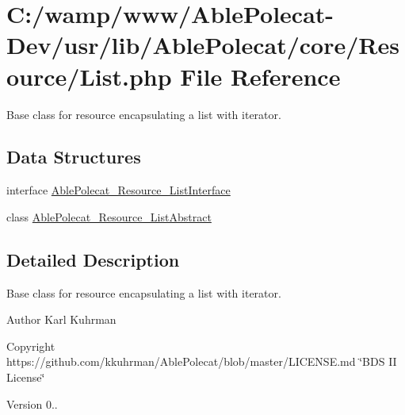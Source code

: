 \hypertarget{_list_8php}{}\section{C\+:/wamp/www/\+Able\+Polecat-\/\+Dev/usr/lib/\+Able\+Polecat/core/\+Resource/\+List.php File Reference}
\label{_list_8php}


Base class for resource encapsulating a list with iterator.  


\subsection*{Data Structures}
\begin{DoxyCompactItemize}
\item 
interface \hyperlink{interface_able_polecat___resource___list_interface}{Able\+Polecat\+\_\+\+Resource\+\_\+\+List\+Interface}
\item 
class \hyperlink{class_able_polecat___resource___list_abstract}{Able\+Polecat\+\_\+\+Resource\+\_\+\+List\+Abstract}
\end{DoxyCompactItemize}


\subsection{Detailed Description}
Base class for resource encapsulating a list with iterator. 

\begin{DoxyAuthor}{Author}
Karl Kuhrman 
\end{DoxyAuthor}
\begin{DoxyCopyright}{Copyright}
https\+://github.com/kkuhrman/\+Able\+Polecat/blob/master/\+L\+I\+C\+E\+N\+S\+E.\+md \char`\"{}\+B\+D\+S I\+I License\char`\"{} 
\end{DoxyCopyright}
\begin{DoxyVersion}{Version}
0.. 
\end{DoxyVersion}

